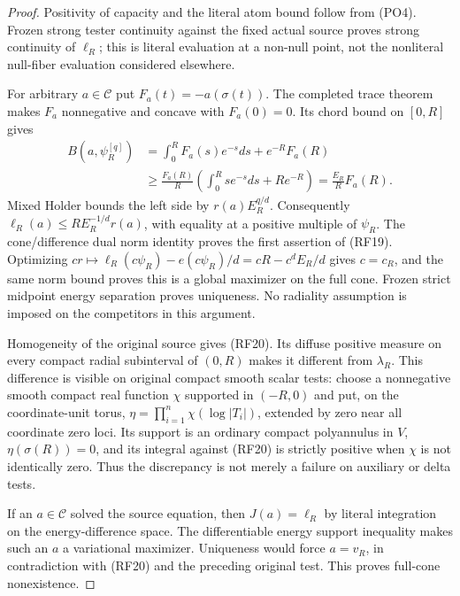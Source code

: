 \begin{proof}
Positivity of capacity and the literal atom bound
follow from \textup{(PO4)}.  Frozen strong tester
continuity against the fixed actual source proves
strong continuity of $\ell_R$; this is literal
evaluation at a non-null point, not the nonliteral
null-fiber evaluation considered elsewhere.

For arbitrary $a\in\mathscr C$ put
$F_a(t)=-a(\sigma(t))$.  The completed trace theorem
makes $F_a$ nonnegative and concave with $F_a(0)=0$.
Its chord bound on $[0,R]$ gives
\[
 \begin{split}
 B(a,\psi_R^{[q]})
   &=\int_0^R F_a(s)e^{-s}ds+e^{-R}F_a(R)\\
   &\ge\frac{F_a(R)}R
             \left(\int_0^R se^{-s}ds+Re^{-R}\right)
     =\frac{E_R}{R}F_a(R).
 \end{split}
 \tag{RF21}
\]
Mixed Holder bounds the left side by $r(a)E_R^{q/d}$.
Consequently $\ell_R(a)\le R E_R^{-1/d}r(a)$,
with equality at a positive multiple of $\psi_R$.
The cone/difference dual norm identity proves the
first assertion of \textup{(RF19)}.  Optimizing
$cr\mapsto\ell_R(c\psi_R)-e(c\psi_R)/d
=cR-c^dE_R/d$ gives $c=c_R$, and the same norm
bound proves this is a global maximizer on the full
cone.  Frozen strict midpoint energy separation
proves uniqueness.  No radiality assumption is
imposed on the competitors in this argument.

Homogeneity of the original source gives
\textup{(RF20)}.  Its diffuse positive measure on
every compact radial subinterval of $(0,R)$ makes
it different from $\lambda_R$.  This difference is
visible on original compact smooth scalar tests:
choose a nonnegative smooth compact real function
$\chi$ supported in $(-R,0)$ and put, on the
coordinate-unit torus,
$\eta=\prod_{i=1}^n\chi(\log|T_i|)$, extended
by zero near all coordinate zero loci.  Its support
is an ordinary compact polyannulus in $V$,
$\eta(\sigma(R))=0$, and its integral against
\textup{(RF20)} is strictly positive when $\chi$
is not identically zero.  Thus the discrepancy is
not merely a failure on auxiliary or delta tests.

If an $a\in\mathscr C$ solved the source equation,
then $J(a)=\ell_R$ by literal integration on the
energy-difference space.  The differentiable energy
support inequality makes such an $a$ a variational
maximizer.  Uniqueness would force $a=v_R$, in
contradiction with \textup{(RF20)} and the preceding
original test.  This proves full-cone nonexistence.
\end{proof}

